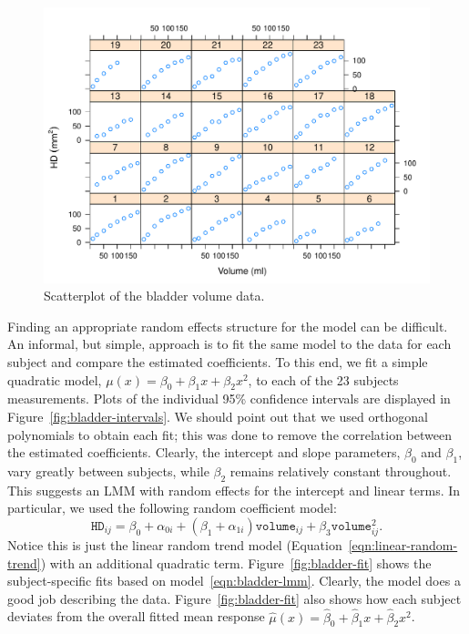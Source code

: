 \documentclass[cmfont,usenames,dvipsnames,leqno]{afit-etd}\usepackage[]{graphicx}\usepackage[]{color}
\makeatletter
\def\maxwidth{ %
  \ifdim\Gin@nat@width>\linewidth
    \linewidth
  \else
    \Gin@nat@width
  \fi
}
\newenvironment{knitrout}{}{} %
\renewenvironment{knitrout}{\begin{singlespace}}{\end{singlespace}}
\newcommand{\wh}[1]{\ensuremath{\widehat{#1}}}
\makeatother
\begin{document}
\begin{knitrout}
\color{fgcolor}\begin{figure}[H]

\includegraphics[width=\maxwidth]{figure/bladder-scatter} \caption[Scatterplot of the bladder volume data]{Scatterplot of the bladder volume data.\label{fig:bladder-scatter}}
\end{figure}


\end{knitrout}


Finding an appropriate random effects structure for the model can be difficult. An informal, but simple, approach is to fit the same model to the data for each subject and compare the estimated coefficients. To this end, we fit a simple quadratic model, $\mu(x) = \beta_0 + \beta_1 x + \beta_2 x^2$, to each of the 23 subjects measurements. Plots of the individual 95\% confidence intervals are displayed in Figure~\ref{fig:bladder-intervals}. We should point out that we used orthogonal polynomials to obtain each fit; this was done to remove the correlation between the estimated coefficients. Clearly, the intercept and slope parameters, $\beta_0$ and $\beta_1$, vary greatly between subjects, while $\beta_2$ remains relatively constant throughout. This suggests an \ac{LMM} with random effects for the intercept and linear terms. In particular, we used the following random coefficient model:
\begin{equation}
\label{eqn:bladder-lmm}
  \texttt{HD}_{ij} = \beta_0+\alpha_{0i} + \left(\beta_1+\alpha_{1i}\right)\texttt{volume}_{ij} + \beta_3\texttt{volume}_{ij}^2.
\end{equation}
Notice this is just the linear random trend model (Equation~\eqref{eqn:linear-random-trend}) with an additional quadratic term. Figure~\ref{fig:bladder-fit} shows the subject-specific fits based on model~\eqref{eqn:bladder-lmm}. Clearly, the model does a good job describing the data. Figure~\ref{fig:bladder-fit} also shows how each subject deviates from the overall fitted mean response $\wh{\mu}\left(x\right) = \wh{\beta}_0 + \wh{\beta}_1 x + \wh{\beta}_2 x^2$.
\end{document}
